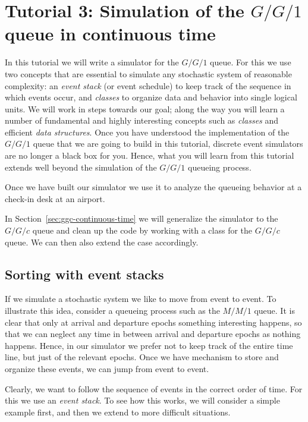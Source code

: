 \section{Tutorial 3: Simulation of the $G/G/1$ queue in continuous time}
\label{sec:simulation-gg1-queue}

In this tutorial we will write a simulator for the $G/G/1$ queue.
For this we use two concepts that are essential to simulate any stochastic system of reasonable complexity: an \emph{event stack} (or event schedule) to keep track of the sequence in which events occur, and \emph{classes} to organize data and behavior into single logical units.
We will work in steps towards our goal; along the way you will learn a number of fundamental and highly interesting concepts such as \emph{classes} and efficient \emph{data structures}.
Once you have understood the implementation of the $G/G/1$ queue that we are going to build in this tutorial, discrete event simulators are no longer a black box for you.
Hence, what you will learn from this tutorial extends well beyond the simulation of the $G/G/1$ queueing process.

Once we have built our simulator we use it to analyze the queueing behavior at a check-in desk at an airport.

In Section~\ref{sec:ggc-continuous-time} we will generalize the simulator to the $G/G/c$ queue and clean up the code by working with a class for the $G/G/c$ queue. We can then also extend the case accordingly.


\subsection{Sorting with event stacks}
\label{sec:event-stacks}

If we simulate a stochastic system we like to move from event to event.
To illustrate this idea, consider a queueing process such as the $M/M/1$ queue.
It is clear that only at arrival and departure epochs something interesting happens, so that we can neglect any time in between arrival and departure epochs as nothing happens.
Hence, in our simulator we prefer not to keep track of the entire time line, but just of the relevant epochs.
Once we have mechanism to store and organize these events, we can jump from event to event.

Clearly, we want to follow the sequence of events in the correct order of time.
For this we use an \emph{event stack}.
To see how this works, we will  consider a simple example first, and then we extend to more difficult situations.

